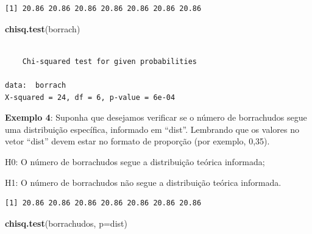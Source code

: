 \documentclass[12pt,portuguese,oneside]{book}
\newenvironment{Shaded}{\begin{snugshade}}{\end{snugshade}}
\newcommand{\KeywordTok}[1]{\textcolor[rgb]{0.13,0.29,0.53}{\textbf{#1}}}
\newcommand{\DataTypeTok}[1]{\textcolor[rgb]{0.13,0.29,0.53}{#1}}
\newcommand{\DecValTok}[1]{\textcolor[rgb]{0.00,0.00,0.81}{#1}}
\newcommand{\FloatTok}[1]{\textcolor[rgb]{0.00,0.00,0.81}{#1}}
\newcommand{\OperatorTok}[1]{\textcolor[rgb]{0.81,0.36,0.00}{\textbf{#1}}}
\newcommand{\NormalTok}[1]{#1}
\begin{document}
\begin{verbatim}
[1] 20.86 20.86 20.86 20.86 20.86 20.86 20.86
\end{verbatim}

\begin{Shaded}
\begin{Highlighting}[]
\KeywordTok{chisq.test}\NormalTok{(borrach)}
\end{Highlighting}
\end{Shaded}

\begin{verbatim}

    Chi-squared test for given probabilities

data:  borrach
X-squared = 24, df = 6, p-value = 6e-04
\end{verbatim}

\textbf{Exemplo 4}: Suponha que desejamos verificar se o número de
borrachudos segue uma distribuição específica, informado em ``dist''.
Lembrando que os valores no vetor ``dist'' devem estar no formato de
proporção (por exemplo, 0,35).

H0: O número de borrachudos segue a distribuição teórica informada;

H1: O número de borrachudos não segue a distribuição teórica informada.

\begin{Shaded}
\end{Shaded}

\begin{verbatim}
[1] 20.86 20.86 20.86 20.86 20.86 20.86 20.86
\end{verbatim}

\begin{Shaded}
\begin{Highlighting}[]
\KeywordTok{chisq.test}\NormalTok{(borrachudos, }\DataTypeTok{p=}\NormalTok{dist)}
\end{Highlighting}
\end{Shaded}
\end{document}
